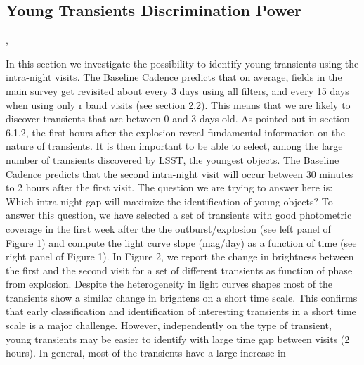 %
%
%

\subsection{Young Transients Discrimination Power}
\def\secname{transientsAge}\label{sec:\secname}

,

In this section we investigate the possibility to identify young
transients using the intra-night visits. The Baseline Cadence predicts
that on average, fields in the main survey get revisited about every 3
days using all filters, and every 15 days when using only r band visits
(see section 2.2).  This means that we are likely to discover transients
that are between 0 and 3 days old. As pointed out in section 6.1.2, the
first hours after the explosion reveal fundamental information on the
nature of transients. It is then important to be able to select, among
the large number of transients discovered by LSST, the youngest objects.
The Baseline Cadence predicts that the second intra-night visit will
occur between 30 minutes to 2 hours after the first visit.  The question
we are trying to answer here is: Which intra-night gap will maximize the
identification of young objects? To answer this question, we have
selected a set of transients with good photometric coverage in the first
week after the the outburst/explosion (see left panel of Figure 1) and
compute the light curve slope (mag/day) as a function of time (see right
panel of Figure 1). In Figure 2,  we report the change in brightness
between the first and the second visit for a set of different transients
as function of phase from explosion. Despite the heterogeneity in light
curves shapes most of the transients show a similar change in brightens
on a short time scale. This confirms that early classification and
identification of interesting transients in a short time scale is a
major challenge. However, independently on the type of transient, young
transients may be easier to identify with large time gap between visits
(2 hours). In general, most of the transients have a large increase in
